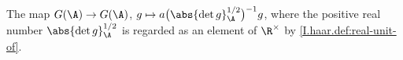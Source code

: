 The map $G(\A)\to G(\A)$, $g\mapsto a\bigl(\abs{\det g}_\A^{1/2}\bigr)^{-1}g$, where the positive real number $\abs{\det g}_\A^{1/2}$ is regarded as an element of $\R^\times$ by \cref{I.haar.def:real-unit-of}.
